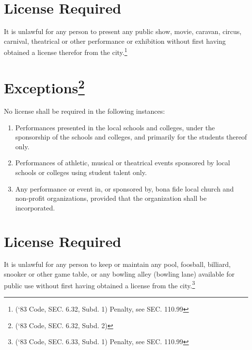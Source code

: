 
\setcounter{section}{29}
\section{License Required}
It is unlawful for any person to present any public show, movie, caravan, circus, carnival, theatrical or other performance or exhibition without first having obtained a license therefor from the city.\footnote{(‘83 Code, SEC. 6.32, Subd. 1)  Penalty, see SEC. 110.99}

\section{Exceptions\footnote{(‘83 Code, SEC. 6.32, Subd. 2)}}
No license shall be required in the following instances:
\begin{enumerate}[{\indent}A)]
    \item Performances presented in the local schools and colleges, under the sponsorship of the schools and colleges, and primarily for the students thereof only.
    \item Performances of athletic, musical or theatrical events sponsored by local schools or colleges using student talent only.
    \item Any performance or event in, or sponsored by, bona fide local church and non-profit organizations, provided that the organization shall be incorporated.
\end{enumerate}


\setcounter{section}{44}
\section{License Required}
It is unlawful for any person to keep or maintain any pool, foosball, billiard, snooker or other game table, or any bowling alley (bowling lane) available for public use without first having obtained a license from the city.\footnote{(‘83 Code, SEC. 6.33, Subd. 1)  Penalty, see SEC. 110.99}

